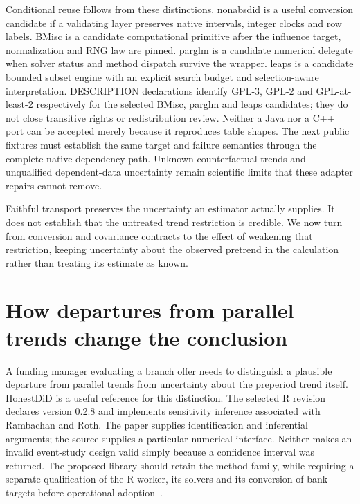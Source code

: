 Conditional reuse follows from these distinctions. nonabsdid is a useful conversion candidate if a validating layer preserves native intervals, integer clocks and row labels. BMisc is a candidate computational primitive after the influence target, normalization and RNG law are pinned. parglm is a candidate numerical delegate when solver status and method dispatch survive the wrapper. leaps is a candidate bounded subset engine with an explicit search budget and selection-aware interpretation. DESCRIPTION declarations identify GPL-3, GPL-2 and GPL-at-least-2 respectively for the selected BMisc, parglm and leaps candidates; they do not close transitive rights or redistribution review. Neither a Java nor a C++ port can be accepted merely because it reproduces table shapes. The next public fixtures must establish the same target and failure semantics through the complete native dependency path. Unknown counterfactual trends and unqualified dependent-data uncertainty remain scientific limits that these adapter repairs cannot remove.~\citep{exec29_panel_inference_sources}


\par
Faithful transport preserves the uncertainty an estimator actually supplies.
It does not establish that the untreated trend restriction is credible. We
now turn from conversion and covariance contracts to the effect of weakening
that restriction, keeping uncertainty about the observed pretrend in the
calculation rather than treating its estimate as known.

\section{How departures from parallel trends change the conclusion}
\label{exec22:hd-scope}

A funding manager evaluating a branch offer needs to distinguish a plausible
departure from parallel trends from uncertainty about the preperiod trend itself.
HonestDiD is a useful reference for this distinction. The selected R revision
declares version 0.2.8 and implements sensitivity inference associated with
Rambachan and Roth. The paper supplies identification and inferential arguments;
the source supplies a particular numerical interface. Neither makes an invalid
event-study design valid simply because a confidence interval was returned.
The proposed library should retain the method family, while requiring a separate
qualification of the R worker, its solvers and its conversion of bank targets
before operational adoption~\citep{rambachan2023,exec22_honestdid_engine}.

